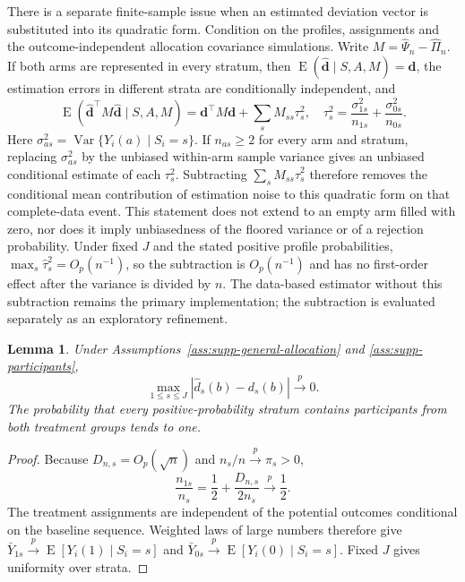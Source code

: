\documentclass[12pt,a4paper]{article}
\newtheorem{lemma}{Lemma}
\theoremstyle{definition}
\theoremstyle{remark}\newtheorem{remark}{Remark}
\numberwithin{equation}{section}
\newcommand{\E}{\operatorname{E}}
\newcommand{\Var}{\operatorname{Var}}
\begin{document}
There is a separate finite-sample issue when an estimated deviation vector is substituted into its quadratic form. Condition on the profiles, assignments and the outcome-independent allocation covariance simulations. Write $M=\widehat\Psi_n-\widehat\Pi_n$. If both arms are represented in every stratum, then $\E(\widehat{\bm d}\mid S,A,M)=\bm d$, the estimation errors in different strata are conditionally independent, and
\[
 \E(\widehat{\bm d}^{\top}M\widehat{\bm d}\mid S,A,M)
 =\bm d^\top M\bm d+\sum_sM_{ss}\tau_s^2,
 \quad
 \tau_s^2=\frac{\sigma_{1s}^2}{n_{1s}}+\frac{\sigma_{0s}^2}{n_{0s}}.
\]
Here $\sigma_{as}^2=\Var\{Y_i(a)\mid S_i=s\}$. If $n_{as}\ge2$ for every arm and stratum, replacing $\sigma_{as}^2$ by the unbiased within-arm sample variance gives an unbiased conditional estimate of each $\tau_s^2$. Subtracting $\sum_sM_{ss}\widehat\tau_s^2$ therefore removes the conditional mean contribution of estimation noise to this quadratic form on that complete-data event. This statement does not extend to an empty arm filled with zero, nor does it imply unbiasedness of the floored variance or of a rejection probability. Under fixed $J$ and the stated positive profile probabilities, $\max_s\widehat\tau_s^2=O_p(n^{-1})$, so the subtraction is $O_p(n^{-1})$ and has no first-order effect after the variance is divided by $n$. The data-based estimator without this subtraction remains the primary implementation; the subtraction is evaluated separately as an exploratory refinement.


\begin{lemma}\label{lem:supp-dhat}
Under Assumptions~\ref{ass:supp-general-allocation} and \ref{ass:supp-participants},
\[
\max_{1\le s\le J}|\widehat d_s(b)-d_s(b)|\xrightarrow{p}0.
\]
The probability that every positive-probability stratum contains participants from both treatment groups tends to one.
\end{lemma}

\begin{proof}
Because $D_{n,s}=O_p(\sqrt n)$ and $n_s/n\xrightarrow{p}\pi_s>0$,
\[
\frac{n_{1s}}{n_s}=\frac12+\frac{D_{n,s}}{2n_s}\xrightarrow{p}\frac12.
\]
The treatment assignments are independent of the potential outcomes conditional on the baseline sequence. Weighted laws of large numbers therefore give
$\bar Y_{1s}\xrightarrow{p}\E[Y_i(1)\mid S_i=s]$ and
$\bar Y_{0s}\xrightarrow{p}\E[Y_i(0)\mid S_i=s]$. Fixed $J$ gives uniformity over strata.
\end{proof}
\end{document}
